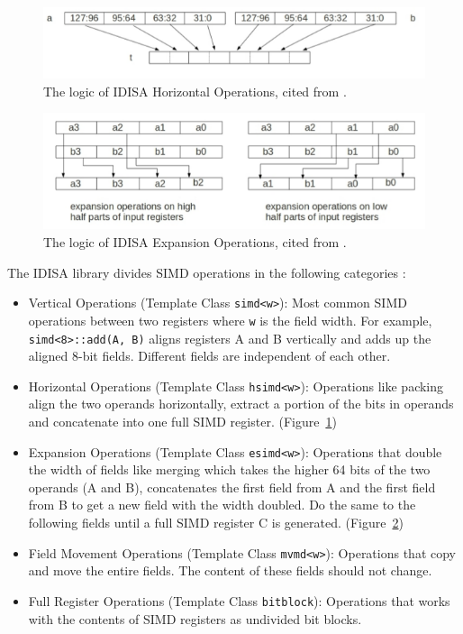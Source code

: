 \begin{figure}[ht!]
\centering
\includegraphics[width=130mm]{draw/horizontal.png}
\caption[Horizontal Operations in IDISA]{The logic of IDISA Horizontal Operations, cited from \cite{hua_idisa}.}
\label{figure:horizontal}
\end{figure}

\begin{figure}[ht!]
\centering
\includegraphics[width=130mm]{draw/expansion.png}
\caption[Expansion Operations in IDISA]{The logic of IDISA Expansion Operations, cited from \cite{hua_idisa}.}
\label{figure:expansion}
\end{figure}

The IDISA library divides SIMD operations in the following categories \cite{idisa_webpage}:
\begin{itemize}
    \item Vertical Operations (Template Class {\tt simd<w>}): Most common SIMD operations between two registers where {\tt w} is the field width. For example, {\tt simd<8>::add(A, B)} aligns registers A and B vertically and adds up the aligned 8-bit fields. Different fields are independent of each other.
    \item Horizontal Operations (Template Class {\tt hsimd<w>}): Operations like packing align the two operands horizontally, extract a portion of the bits in operands and concatenate into one full SIMD register. (Figure~\ref{figure:horizontal})
    \item Expansion Operations (Template Class {\tt esimd<w>}): Operations that double the width of fields like merging which takes the higher 64 bits of the two operands (A and B), concatenates the first field from A and the first field from B to get a new field with the width doubled. Do the same to the following fields until a full SIMD register C is generated. (Figure~\ref{figure:expansion})
    \item Field Movement Operations (Template Class {\tt mvmd<w>}): Operations that copy and move the entire fields. The content of these fields should not change.
    \item Full Register Operations (Template Class {\tt bitblock}): Operations that works with the contents of SIMD registers as undivided bit blocks.
\end{itemize}

